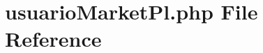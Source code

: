 \hypertarget{usuario_market_pl_8php}{}\section{usuario\+Market\+Pl.\+php File Reference}
\label{usuario_market_pl_8php}
